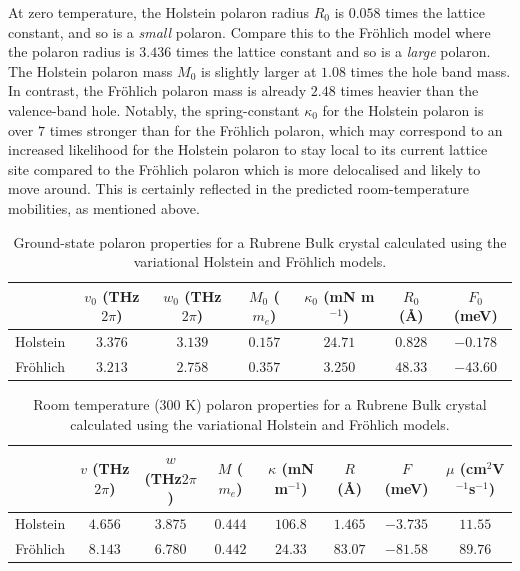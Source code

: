 At zero temperature, the Holstein polaron radius $R_0$ is $0.058$ times the lattice constant, and so is a \emph{small} polaron. Compare this to the Fr\"ohlich model where the polaron radius is $3.436$ times the lattice constant and so is a \emph{large} polaron. The Holstein polaron mass $M_0$ is slightly larger at $1.08$ times the hole band mass. In contrast, the Fr\"ohlich polaron mass is already $2.48$ times heavier than the valence-band hole. Notably, the spring-constant $\kappa_0$ for the Holstein polaron is over $7$ times stronger than for the Fr\"ohlich polaron, which may correspond to an increased likelihood for the Holstein polaron to stay local to its current lattice site compared to the Fr\"ohlich polaron which is more delocalised and likely to move around. This is certainly reflected in the predicted room-temperature mobilities, as mentioned above.

\begin{table}
    \centering
    \begin{tabular}{|c|c|c|c|c|c|c|}
    \hline
        & $v_0$ (THz$2\pi$) & $w_0$ (THz$2\pi$) & $M_0$ ($m_e$) &  $\kappa_0$ (mN m$^{-1}$) & $R_0$ (Å) & $F_0$ (meV) \\
    \hline
         Holstein & $3.376$ & $3.139$ & $0.157$ & $24.71$ & $0.828$ & $-0.178$ \\
    \hline
         Fr\"ohlich & $3.213$ & $2.758$ & $0.357$ & $3.250$ & $48.33$ & $-43.60$ \\
    \hline
    \end{tabular}
    \caption{Ground-state polaron properties for a Rubrene Bulk crystal calculated using the variational Holstein and Fr\"ohlich models.}
    \label{tab:rubrenegs}
\end{table}

\begin{table}
    \centering
    \begin{tabular}{|c|c|c|c|c|c|c|c|}
    \hline
        & $v$ (THz$2\pi$) & $w$ (THz$2\pi$) & $M$ ($m_e$) &  $\kappa$ (mN m$^{-1}$) & $R$ (Å) & $F$ (meV) & $\mu$ (cm$^2$V$^{-1}$s$^{-1}$) \\
    \hline
         Holstein & $4.656$ & $3.875$ & $0.444$ & $106.8$ & $1.465$ & $-3.735$ & $11.55$ \\
    \hline
        Fr\"ohlich & $8.143$ & $6.780$ & $0.442$ & $24.33$ & $83.07$ & $-81.58$ & $89.76$ \\
    \hline
    \end{tabular}
    \caption{Room temperature ($300$ K) polaron properties for a Rubrene Bulk crystal calculated using the variational Holstein and Fr\"ohlich models.}
    \label{tab:rubrenert}
\end{table}

